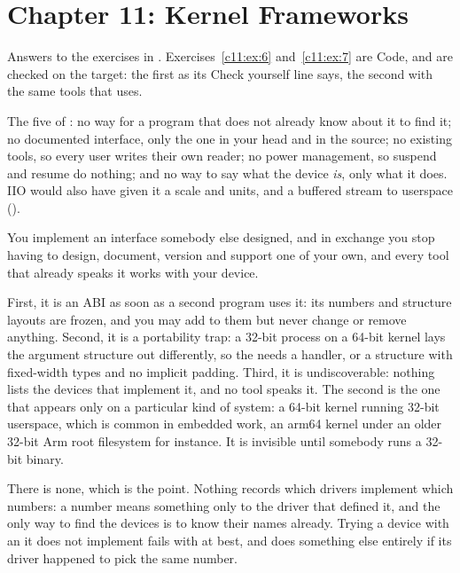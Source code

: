 
\section{Chapter 11: Kernel Frameworks}
\label{sol:sec:c11}
Answers to the exercises in . Exercises~\ref{c11:ex:6} and~\ref{c11:ex:7}
are Code, and are checked on the target: the first as its Check yourself line says, the second with
the same tools that  uses.


 The five of : no way for a program that does not already know about it
to find it; no documented interface, only the one in your head and in the source; no existing
tools, so every user writes their own reader; no power management, so suspend and resume do
nothing; and no way to say what the device \emph{is}, only what it does. IIO would also have given
it a scale and units, and a buffered stream to userspace ().

 You implement an interface somebody else designed, and in exchange you stop having to
design, document, version and support one of your own, and every tool that already speaks it works
with your device.

 First, it is an ABI as soon as a second program uses it: its numbers and structure
layouts are frozen, and you may add to them but never change or remove anything. Second, it is a
portability trap: a 32-bit process on a 64-bit kernel lays the argument structure out differently,
so the  needs a  handler, or a structure with fixed-width types and no
implicit padding. Third, it is undiscoverable: nothing lists the devices that implement it, and no
tool speaks it. The second is the one that appears only on a particular kind of system: a 64-bit
kernel running 32-bit userspace, which is common in embedded work, an arm64 kernel under an older
32-bit Arm root filesystem for instance. It is invisible until somebody runs a 32-bit binary.

 There is none, which is the point. Nothing records which drivers implement which
 numbers: a number means something only to the driver that defined it, and the only way
to find the devices is to know their names already. Trying a device with an  it does
not implement fails with  at best, and does something else entirely if its driver
happened to pick the same number.

